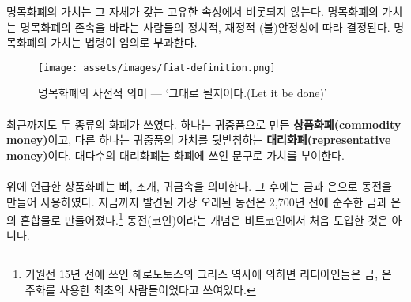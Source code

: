 \begin{comment}
The value of fiat money does not stem from its inherent properties. How
good a certain type of fiat money is, is only correlated to the
political and fiscal (in)stability of those who dream it into existence.
Its value is imposed by decree, arbitrarily.
\end{comment}
명목화폐의 가치는 그 자체가 갖는 고유한 속성에서 비롯되지 않는다.
명목화폐의 가치는 명목화폐의 존속을 바라는 사람들의 정치적, 재정적 (불)안정성에 따라 결정된다.
명목화폐의 가치는 법령이 임의로 부과한다.

\begin{figure}
  \centering
  \texttt{[image: assets/images/fiat-definition.png]}
  \caption{명목화폐의 사전적 의미 --- `그대로 될지어다.(Let it be done)'}
  \label{fig:fiat-definition}
\end{figure}

\paragraph{}
최근까지도 두 종류의 화폐가 쓰였다.
하나는 귀중품으로 만든 \textbf{상품화폐(commodity money)}이고, 
다른 하나는 귀중품의 가치를 뒷받침하는 \textbf{대리화폐(representative money)}이다.
대다수의 대리화폐는 화폐에 쓰인 문구로 가치를 부여한다.

\paragraph{}
\begin{comment}
We already touched on commodity money above. People used special bones,
seashells, and precious metals as money. Later on, mainly coins made out of
precious metals like gold and silver were used as money. The oldest coin found
so far is made of a natural gold-and-silver mix and was made more than 2700
years ago.\footnote{According to the Greek historian Herodotus, writing in the
fifth century BC, the Lydians were the first people to have used gold and silver
coinage. \cite{coinage-origins}} If something is new in Bitcoin, the concept of
a coin is not it.
\end{comment}
위에 언급한 상품화폐는 뼈, 조개, 귀금속을 의미한다. 
그 후에는 금과 은으로 동전을 만들어 사용하였다.
지금까지 발견된 가장 오래된 동전은 2,700년 전에 순수한 금과 은의 혼합물로 만들어졌다.\footnote{기원전 15년 전에 쓰인 헤로도토스의 그리스 역사에 의하면 리디아인들은 금, 은 주화를 사용한 최초의 사람들이었다고 쓰여있다.\cite{coinage-origins}}
동전(코인)이라는 개념은 비트코인에서 처음 도입한 것은 아니다.

